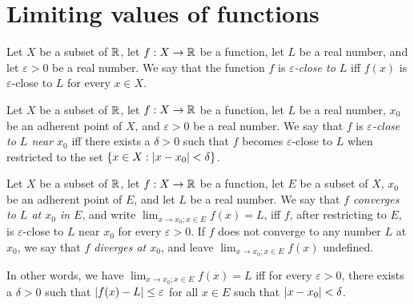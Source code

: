 \section{Limiting values of functions}\label{sec:9.3}

\begin{defn}\label{9.3.1}
  Let \(X\) be a subset of \(\mathbb{R}\), let \(f : X \to \mathbb{R}\) be a function, let \(L\) be a real number, and let \(\varepsilon > 0\) be a real number.
  We say that the function \(f\) is \emph{\(\varepsilon\)-close to \(L\)} iff \(f(x)\) is \(\varepsilon\)-close to \(L\) for every \(x \in X\).
\end{defn}

\setcounter{thm}{2}
\begin{defn}\label{9.3.3}
  Let \(X\) be a subset of \(\mathbb{R}\), let \(f : X \to \mathbb{R}\) be a function, let \(L\) be a real number, \(x_0\) be an adherent point of \(X\), and \(\varepsilon > 0\) be a real number.
  We say that \(f\) is \emph{\(\varepsilon\)-close to \(L\) near \(x_0\)} iff there exists a \(\delta > 0\) such that \(f\) becomes \(\varepsilon\)-close to \(L\) when restricted to the set \(\left\lbrace x \in X : \left\lvert x - x_0\right\rvert < \delta\right\rbrace\).
\end{defn}

\setcounter{thm}{5}
\begin{defn}\label{9.3.6}
  Let \(X\) be a subset of \(\mathbb{R}\), let \(f : X \to \mathbb{R}\) be a function, let \(E\) be a subset of \(X\), \(x_0\) be an adherent point of \(E\), and let \(L\) be a real number.
  We say that \emph{\(f\) converges to \(L\) at \(x_0\) in \(E\)}, and write \(\lim_{x \to x_0 ; x \in E} f(x) = L\), iff \(f\), after restricting to \(E\), is \(\varepsilon\)-close to \(L\) near \(x_0\) for every \(\varepsilon > 0\).
  If \(f\) does not converge to any number \(L\) at \(x_0\), we say that \emph{\(f\) diverges at \(x_0\)}, and leave \(\lim_{x \to x_0 ; x \in E} f(x)\) undefined.
\end{defn}

\begin{note}
  In other words, we have \(\lim_{x \to x_0 ; x \in E} f(x) = L\) iff for every \(\varepsilon > 0\), there exists a \(\delta > 0\) such that \(\left\lvert f(x) - L\right\rvert \leq \varepsilon\) for all \(x \in E\) such that \(\left\lvert x - x_0\right\rvert < \delta\).
\end{note}


